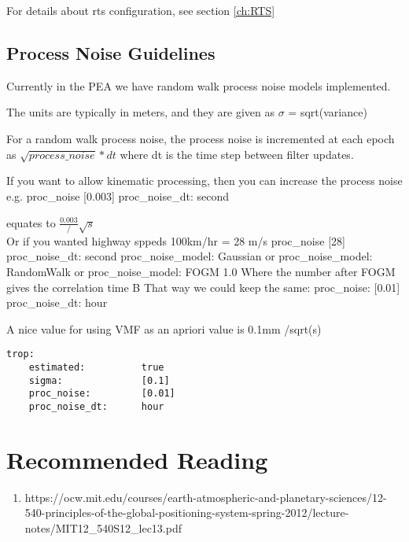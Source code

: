 For details about rts configuration, see section \ref{ch:RTS}


\subsection{Process Noise Guidelines}

Currently in the PEA we have random walk process noise models implemented.

The units are typically in meters, and they are given as $\sigma$ = sqrt(variance)

For a random walk process noise, the process noise is incremented at each epoch as $\sqrt{process\_noise}*dt$ where dt is the time step between filter updates.

If you want to allow kinematic processing, then you can increase the process noise e.g.
proc\_noise [0.003]
proc\_noise\_dt: second 

equates to $\frac{0.003}/\sqrt{s}$
\\ 
Or if you wanted highway sppeds 100km/hr = 28 m/s
proc\_noise [28]
proc\_noise\_dt: second
proc\_noise\_model:   Gaussian
or
         proc\_noise\_model:   RandomWalk
or
         proc\_noise\_model:   FOGM 1.0
Where the number after FOGM gives the correlation time B
That way we could keep the same:
            proc\_noise:         [0.01]
            proc\_noise\_dt:      hour

A nice value for using VMF as an apriori value is 0.1mm /sqrt(s)
%
\begin{lstlisting}
trop:
    estimated:          true
    sigma:              [0.1]
    proc_noise:         [0.01]
    proc_noise_dt:      hour
\end{lstlisting}



\section{Recommended Reading}

\begin{enumerate}
    \item https://ocw.mit.edu/courses/earth-atmospheric-and-planetary-sciences/12-540-principles-of-the-global-positioning-system-spring-2012/lecture-notes/MIT12\_540S12\_lec13.pdf
\end{enumerate}






